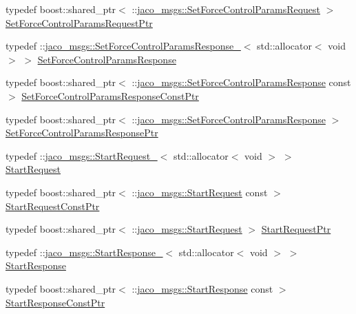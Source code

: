 \begin{DoxyCompactItemize}
\item 
typedef boost\+::shared\+\_\+ptr$<$ \+::\hyperlink{namespacejaco__msgs_a3486b7826c8a999135bb2eded905e7a8}{jaco\+\_\+msgs\+::\+Set\+Force\+Control\+Params\+Request} $>$ \hyperlink{namespacejaco__msgs_a8d8788dbe785e356791b6f3d2169b867}{Set\+Force\+Control\+Params\+Request\+Ptr}
\item 
typedef \+::\hyperlink{structjaco__msgs_1_1SetForceControlParamsResponse__}{jaco\+\_\+msgs\+::\+Set\+Force\+Control\+Params\+Response\+\_\+}$<$ std\+::allocator$<$ void $>$ $>$ \hyperlink{namespacejaco__msgs_afebda443b838c4657280c3c24ba107ba}{Set\+Force\+Control\+Params\+Response}
\item 
typedef boost\+::shared\+\_\+ptr$<$ \+::\hyperlink{namespacejaco__msgs_afebda443b838c4657280c3c24ba107ba}{jaco\+\_\+msgs\+::\+Set\+Force\+Control\+Params\+Response} const  $>$ \hyperlink{namespacejaco__msgs_ac7f6242b4706d62afb32118f3bc8f7f8}{Set\+Force\+Control\+Params\+Response\+Const\+Ptr}
\item 
typedef boost\+::shared\+\_\+ptr$<$ \+::\hyperlink{namespacejaco__msgs_afebda443b838c4657280c3c24ba107ba}{jaco\+\_\+msgs\+::\+Set\+Force\+Control\+Params\+Response} $>$ \hyperlink{namespacejaco__msgs_a037c85054e5e00295f67040ccbace49e}{Set\+Force\+Control\+Params\+Response\+Ptr}
\item 
typedef \+::\hyperlink{structjaco__msgs_1_1StartRequest__}{jaco\+\_\+msgs\+::\+Start\+Request\+\_\+}$<$ std\+::allocator$<$ void $>$ $>$ \hyperlink{namespacejaco__msgs_a967d4b8e4c7fe72a2b13622d4ac5b317}{Start\+Request}
\item 
typedef boost\+::shared\+\_\+ptr$<$ \+::\hyperlink{namespacejaco__msgs_a967d4b8e4c7fe72a2b13622d4ac5b317}{jaco\+\_\+msgs\+::\+Start\+Request} const  $>$ \hyperlink{namespacejaco__msgs_afdbcdea38f5a029509c0e584f2a09e65}{Start\+Request\+Const\+Ptr}
\item 
typedef boost\+::shared\+\_\+ptr$<$ \+::\hyperlink{namespacejaco__msgs_a967d4b8e4c7fe72a2b13622d4ac5b317}{jaco\+\_\+msgs\+::\+Start\+Request} $>$ \hyperlink{namespacejaco__msgs_a98d6ba1c0a72e9842611a1e4daea6570}{Start\+Request\+Ptr}
\item 
typedef \+::\hyperlink{structjaco__msgs_1_1StartResponse__}{jaco\+\_\+msgs\+::\+Start\+Response\+\_\+}$<$ std\+::allocator$<$ void $>$ $>$ \hyperlink{namespacejaco__msgs_ab90a2d56175265d26907e49c8a56088d}{Start\+Response}
\item 
typedef boost\+::shared\+\_\+ptr$<$ \+::\hyperlink{namespacejaco__msgs_ab90a2d56175265d26907e49c8a56088d}{jaco\+\_\+msgs\+::\+Start\+Response} const  $>$ \hyperlink{namespacejaco__msgs_a619210a150fb5f70e79fa74e741373ec}{Start\+Response\+Const\+Ptr}

\end{DoxyCompactItemize}
